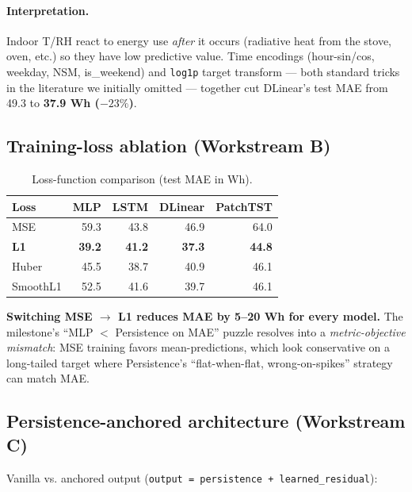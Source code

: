 \documentclass[11pt,letterpaper]{article}
\begin{document}
\paragraph{Interpretation.} Indoor T/RH react to energy use \emph{after} it
occurs (radiative heat from the stove, oven, etc.) so they have low
predictive value. Time encodings (hour-sin/cos, weekday, NSM, is\_weekend)
and \texttt{log1p} target transform --- both standard tricks in the
literature we initially omitted --- together cut DLinear's test MAE from
49.3 to \textbf{37.9 Wh ($-23\%$)}.

\subsection{Training-loss ablation (Workstream B)}
\label{sec:loss}

\begin{table}[H]
\centering
\small
\begin{tabular}{lrrrr}
\toprule
\textbf{Loss} & \textbf{MLP} & \textbf{LSTM} & \textbf{DLinear} & \textbf{PatchTST} \\
\midrule
MSE      & 59.3          & 43.8          & 46.9          & 64.0 \\
\textbf{L1} & \textbf{39.2} & \textbf{41.2} & \textbf{37.3} & \textbf{44.8} \\
Huber    & 45.5          & 38.7          & 40.9          & 46.1 \\
SmoothL1 & 52.5          & 41.6          & 39.7          & 46.1 \\
\bottomrule
\end{tabular}
\caption{Loss-function comparison (test MAE in Wh).}
\end{table}

\textbf{Switching MSE $\rightarrow$ L1 reduces MAE by 5--20 Wh for every
model.} The milestone's ``MLP $<$ Persistence on MAE'' puzzle resolves
into a \emph{metric-objective mismatch}: MSE training favors
mean-predictions, which look conservative on a long-tailed target where
Persistence's ``flat-when-flat, wrong-on-spikes'' strategy can match MAE.

\subsection{Persistence-anchored architecture (Workstream C)}

Vanilla vs. anchored output (\texttt{output = persistence + learned\_residual}):
\end{document}
